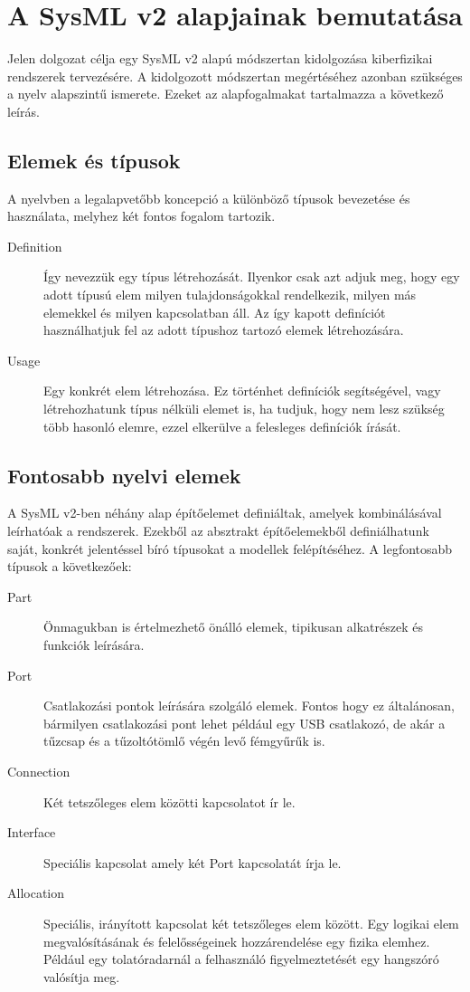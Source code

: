 \section{A SysML v2 alapjainak bemutatása}
Jelen dolgozat célja egy SysML v2 alapú módszertan kidolgozása kiberfizikai rendszerek tervezésére.
A kidolgozott módszertan megértéséhez azonban szükséges a nyelv alapszintű ismerete. Ezeket az alapfogalmakat tartalmazza a következő leírás.

    \subsection{Elemek és típusok}
    A nyelvben a legalapvetőbb koncepció a különböző típusok bevezetése és használata, melyhez két fontos fogalom tartozik.
    \begin{description}
        \item[Definition] Így nevezzük egy típus létrehozását. Ilyenkor csak azt adjuk meg, hogy egy adott típusú elem milyen tulajdonságokkal rendelkezik, milyen más elemekkel és milyen kapcsolatban áll. Az így kapott definíciót használhatjuk fel az adott típushoz tartozó elemek létrehozására.
        \item[Usage] Egy konkrét elem létrehozása. Ez történhet definíciók segítségével, vagy létrehozhatunk típus nélküli elemet is, ha tudjuk, hogy nem lesz szükség több hasonló elemre, ezzel elkerülve a felesleges definíciók írását.
    \end{description}

    \subsection{Fontosabb nyelvi elemek} \label{sec:NyelviElemek}
    A SysML v2-ben néhány alap építőelemet definiáltak, amelyek kombinálásával leírhatóak a rendszerek. Ezekből az absztrakt építőelemekből definiálhatunk saját, konkrét jelentéssel bíró típusokat a modellek felépítéséhez. A legfontosabb típusok a következőek:
    \begin{description}
        \item[Part] Önmagukban is értelmezhető önálló elemek, tipikusan alkatrészek és funkciók leírására.
        \item[Port] Csatlakozási pontok leírására szolgáló elemek. Fontos hogy ez általánosan, bármilyen csatlakozási pont lehet például egy USB csatlakozó, de akár a tűzcsap és a tűzoltótömlő végén levő fémgyűrűk is.
        \item[Connection] Két tetszőleges elem közötti kapcsolatot ír le.
        \item[Interface] Speciális kapcsolat amely két Port kapcsolatát írja le.
        \item[Allocation] Speciális, irányított kapcsolat két tetszőleges elem között. Egy logikai elem megvalósításának és felelősségeinek hozzárendelése egy fizika elemhez. Például egy tolatóradarnál a felhasználó figyelmeztetését egy hangszóró valósítja meg.
    \end{description}

